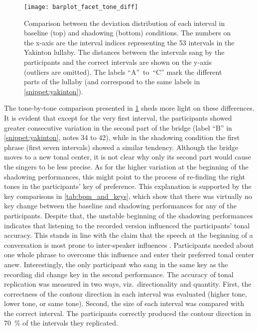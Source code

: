 %
\begin{figure}[t]
	\centering
	\texttt{[image: barplot\_facet\_tone\_diff]}
	\caption[Interval deviations in baseline and shadowing performances]
		{Comparison between the deviation distribution of each interval in baseline (top) and shadowing (bottom) conditions.
		The numbers on the x-axis are the interval indices representing the 53 intervals in the Yakinton lullaby.
		The distances between the intervals sang by the participants and the correct intervals are shown on the y-axis (outliers are omitted).
		The labels \enquote{A}~to~\enquote{C} mark the different parts of the lullaby (and correspond to the same labels in \cref{snippet:yakinton}).}
	\label{fig:barplot_facet_tone_diff}
\end{figure}
%
The tone-by-tone comparison presented in \cref{fig:barplot_facet_tone_diff} sheds more light on these differences.
It is evident that except for the very first interval, the participants showed greater consecutive variation in the second part of the bridge (label \enquote{B} in \cref{snippet:yakinton}, notes 34 to 42), while in the shadowing condition the first phrase (first seven intervals) showed a similar tendency.
Although the bridge moves to a new tonal center, it is not clear why only its second part would cause the singers to be less precise.
As for the higher variation at the beginning of the shadowing performances, this might point to the process of re-finding the right tones in the participants' key of preference.
This explanation is supported by the key comparisons in \cref{tab:bpm_and_keys}, which show that there was virtually no key change between the baseline and shadowing performances for any of the participants.
Despite that, the unstable beginning of the shadowing performances indicates that listening to the recorded version influenced the participants' tonal accuracy.
This stands in line with the claim that the speech at the beginning of a conversation is most prone to inter-speaker influences \citep[e.g.][]{Orlob2018nine}.
Participants needed about one whole phrase to overcome this influence and enter their preferred tonal center anew.
Interestingly, the only participant who sang in the same key as the recording did change key in the second performance.
The accuracy of tonal replication was measured in two ways, viz.\ directionality and quantity.
First, the correctness of the contour direction in each interval was evaluated (higher tone, lower tone, or same tone).
Second, the size of each interval was compared with the correct interval.
The participants correctly produced the contour direction in \SI{70}{\percent} of the intervals they replicated.
